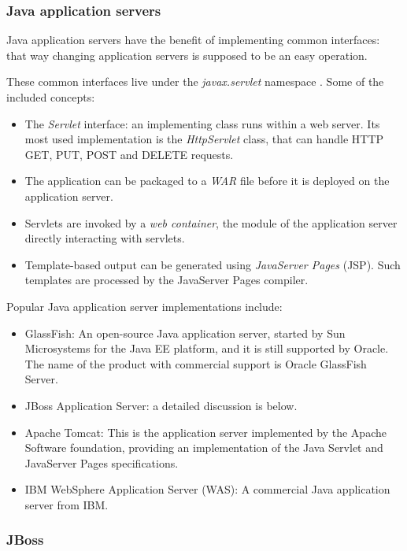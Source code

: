 \subsubsection*{Java application servers}

Java application servers have the benefit of implementing common interfaces:
that way changing application servers is supposed to be an easy operation.

These common interfaces live under the \emph{javax.servlet} namespace \cite{javax-servlet}.
Some of the included concepts:

\begin{itemize}
\item The \emph{Servlet} interface: an implementing class runs within a web
server. Its most used implementation is the \emph{HttpServlet} class, that can
handle HTTP GET, PUT, POST and DELETE requests.
\item The application can be packaged to a \emph{WAR} file before it is deployed
on the application server.
\item Servlets are invoked by a \emph{web container}, the module of the
application server directly interacting with servlets.
\item Template-based output can be generated using \emph{JavaServer Pages}
(JSP). Such templates are processed by the JavaServer Pages compiler.
\end{itemize}

Popular Java application server implementations include:

\begin{itemize}
\item GlassFish: An open-source Java application server, started by Sun
Microsystems for the Java EE platform, and it is still supported by Oracle. The
name of the product with commercial support is Oracle GlassFish Server.
\item JBoss Application Server: a detailed discussion is below.
\item Apache Tomcat: This is the application server implemented by the Apache
Software foundation, providing an implementation of the Java Servlet and
JavaServer Pages specifications.
\item IBM WebSphere Application Server (WAS): A commercial Java application
server from IBM.
\end{itemize}

\subsubsection*{JBoss}

